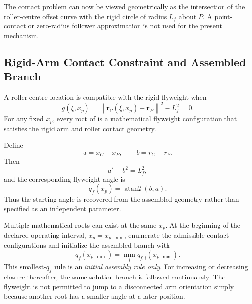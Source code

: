 \documentclass[11pt]{report}
\numberwithin{equation}{section}
\begin{document}
The contact problem can now be viewed geometrically as the intersection of the
roller-centre offset curve with the rigid circle of radius \(L_f\) about \(P\).
A point-contact or zero-radius follower approximation is not used for the
present mechanism.

\subsection{Rigid-Arm Contact Constraint and Assembled Branch}
\label{app:flyweight_solve_q}

A roller-centre location is compatible with the rigid flyweight when
\begin{equation}
    \boxed{
    g(\xi,x_p)
    =
    \left\|
        \bm r_C(\xi,x_p)-\bm r_P
    \right\|^2
    -
    L_f^2
    =0.
    }
    \label{eq:appB_contact_residual}
\end{equation}
For any fixed \(x_p\), every root of  is a
mathematical flyweight configuration that satisfies the rigid arm and roller
contact geometry.

Define
\begin{equation}
    a=x_C-x_P,
    \qquad
    b=r_C-r_P.
    \label{eq:appB_ab_def}
\end{equation}
Then
\begin{equation}
    a^2+b^2=L_f^2,
\end{equation}
and the corresponding flyweight angle is
\begin{equation}
    \boxed{
    q_f(x_p)=\operatorname{atan2}(b,a).
    }
    \label{eq:appB_q_map}
\end{equation}
Thus the starting angle is recovered from the assembled geometry rather than
specified as an independent parameter.

Multiple mathematical roots can exist at the same \(x_p\). At the beginning of
the declared operating interval, \(x_p=x_{p,\min}\), enumerate the admissible
contact configurations and initialize the assembled branch with
\begin{equation}
    \boxed{
    q_f(x_{p,\min})
    =
    \min_i q_{f,i}(x_{p,\min}).
    }
    \label{eq:appB_initial_branch_rule}
\end{equation}
This smallest-\(q_f\) rule is an \emph{initial assembly rule only}. For increasing
or decreasing closure thereafter, the same solution branch is followed
continuously. The flyweight is not permitted to jump to a disconnected arm
orientation simply because another root has a smaller angle at a later
position.
\end{document}
